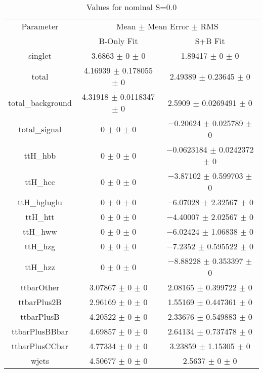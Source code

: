 \begin{table}
\centering
\caption{Values for nominal S=0.0}
\begin{tabular}{ccc}
\toprule
Parameter & \multicolumn{2}{c}{Mean $\pm$ Mean Error $\pm$ RMS}\\
 & B-Only Fit & S+B Fit\\
\midrule
singlet & \num{3.6863} $\pm$ \num{0} $\pm$ \num{0} & \num{1.89417} $\pm$ \num{0} $\pm$ \num{0}\\
total & \num{4.16939} $\pm$ \num{0.178055} $\pm$ \num{0} & \num{2.49389} $\pm$ \num{0.23645} $\pm$ \num{0}\\
total\_background & \num{4.31918} $\pm$ \num{0.0118347} $\pm$ \num{0} & \num{2.5909} $\pm$ \num{0.0269491} $\pm$ \num{0}\\
total\_signal & \num{0} $\pm$ \num{0} $\pm$ \num{0} & \num{-0.20624} $\pm$ \num{0.025789} $\pm$ \num{0}\\
ttH\_hbb & \num{0} $\pm$ \num{0} $\pm$ \num{0} & \num{-0.0623184} $\pm$ \num{0.0242372} $\pm$ \num{0}\\
ttH\_hcc & \num{0} $\pm$ \num{0} $\pm$ \num{0} & \num{-3.87102} $\pm$ \num{0.599703} $\pm$ \num{0}\\
ttH\_hgluglu & \num{0} $\pm$ \num{0} $\pm$ \num{0} & \num{-6.07028} $\pm$ \num{2.32567} $\pm$ \num{0}\\
ttH\_htt & \num{0} $\pm$ \num{0} $\pm$ \num{0} & \num{-4.40007} $\pm$ \num{2.02567} $\pm$ \num{0}\\
ttH\_hww & \num{0} $\pm$ \num{0} $\pm$ \num{0} & \num{-6.02424} $\pm$ \num{1.06838} $\pm$ \num{0}\\
ttH\_hzg & \num{0} $\pm$ \num{0} $\pm$ \num{0} & \num{-7.2352} $\pm$ \num{0.595522} $\pm$ \num{0}\\
ttH\_hzz & \num{0} $\pm$ \num{0} $\pm$ \num{0} & \num{-8.88228} $\pm$ \num{0.353397} $\pm$ \num{0}\\
ttbarOther & \num{3.07867} $\pm$ \num{0} $\pm$ \num{0} & \num{2.08165} $\pm$ \num{0.399722} $\pm$ \num{0}\\
ttbarPlus2B & \num{2.96169} $\pm$ \num{0} $\pm$ \num{0} & \num{1.55169} $\pm$ \num{0.447361} $\pm$ \num{0}\\
ttbarPlusB & \num{4.20522} $\pm$ \num{0} $\pm$ \num{0} & \num{2.33676} $\pm$ \num{0.549883} $\pm$ \num{0}\\
ttbarPlusBBbar & \num{4.69857} $\pm$ \num{0} $\pm$ \num{0} & \num{2.64134} $\pm$ \num{0.737478} $\pm$ \num{0}\\
ttbarPlusCCbar & \num{4.77334} $\pm$ \num{0} $\pm$ \num{0} & \num{3.23859} $\pm$ \num{1.15305} $\pm$ \num{0}\\
wjets & \num{4.50677} $\pm$ \num{0} $\pm$ \num{0} & \num{2.5637} $\pm$ \num{0} $\pm$ \num{0}\\
\bottomrule
\end{tabular}
\end{table}